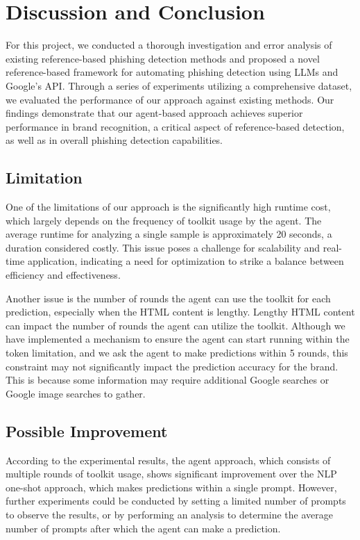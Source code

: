 \section{Discussion and Conclusion}

For this project, we conducted a thorough investigation and error analysis of existing reference-based phishing detection methods and proposed a novel reference-based framework for automating phishing detection using LLMs and Google's API. Through a series of experiments utilizing a comprehensive dataset, we evaluated the performance of our approach against existing methods. Our findings demonstrate that our agent-based approach achieves superior performance in brand recognition, a critical aspect of reference-based detection, as well as in overall phishing detection capabilities.

\subsection{Limitation}

One of the limitations of our approach is the significantly high runtime cost, which largely depends on the frequency of toolkit usage by the agent. The average runtime for analyzing a single sample is approximately 20 seconds, a duration considered costly. This issue poses a challenge for scalability and real-time application, indicating a need for optimization to strike a balance between efficiency and effectiveness.

Another issue is the number of rounds the agent can use the toolkit for each prediction, especially when the HTML content is lengthy. Lengthy HTML content can impact the number of rounds the agent can utilize the toolkit. Although we have implemented a mechanism to ensure the agent can start running within the token limitation, and we ask the agent to make predictions within 5 rounds, this constraint may not significantly impact the prediction accuracy for the brand. This is because some information may require additional Google searches or Google image searches to gather.

\subsection{Possible Improvement}

According to the experimental results, the agent approach, which consists of multiple rounds of toolkit usage, shows significant improvement over the NLP one-shot approach, which makes predictions within a single prompt. However, further experiments could be conducted by setting a limited number of prompts to observe the results, or by performing an analysis to determine the average number of prompts after which the agent can make a prediction.

